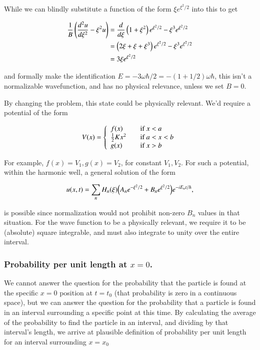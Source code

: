 While we can blindly substitute a function of the form $\xi e^{\xi^2/2}$ into this to get

\begin{align*}
\frac{1}{B} \left(\frac{d^2 u}{d\xi^2} - \xi^2 u\right)
&=
\frac{d}{d\xi} \left( 1 + \xi^2 \right) e^{\xi^2/2} - \xi^3 e^{\xi^2/2} \\
&=
\left( 2 \xi + \xi + \xi^3 \right) e^{\xi^2/2} - \xi^3 e^{\xi^2/2} \\
&=
3 \xi e^{\xi^2/2}
\end{align*}

and formally make the identification $E = -3 \omega \hbar/2 = -(1 + 1/2) \omega \hbar$, this isn't a normalizable wavefunction, and has no physical relevance, unless we set $B = 0$.

By changing the problem, this state could be physically relevant.  We'd require a potential of the form

\begin{equation}\label{eqn:qmIproblemSet5:11}
V(x) =
\left\{
\begin{array}{l l}
f(x) & \quad \mbox{if $x < a$} \\
\frac{1}{2} K x^2 & \quad \mbox{if $a < x < b$} \\
g(x) & \quad \mbox{if $x > b$} \\
\end{array}
\right.
\end{equation}

For example, $f(x) = V_1, g(x) = V_2$, for constant $V_1, V_2$.  For such a potential, within the harmonic well, a general solution of the form

\begin{equation}\label{eqn:qmIproblemSet5:19}
u(x,t) = \sum_n H_n(\xi) \Bigl(A_n e^{-\xi^2/2} + B_n e^{\xi^2/2} \Bigr) e^{-i E_n t/\hbar},
\end{equation}

is possible since normalization would not prohibit non-zero $B_n$ values in that situation.  For the wave function to be a physically relevant, we require it to be (absolute) square integrable, and must also integrate to unity over the entire interval.

\subsubsection{Probability per unit length at $x=0$.}

We cannot answer the question for the probability that the particle is found at the specific $x=0$ position at $t=t_0$ (that probability is zero in a continuous space), but we can answer the question for the probability that a particle is found in an interval surrounding a specific point at this time.  By calculating the average of the probability to find the particle in an interval, and dividing by that interval's length, we arrive at plausible definition of probability per unit length for an interval surrounding $x = x_0$

